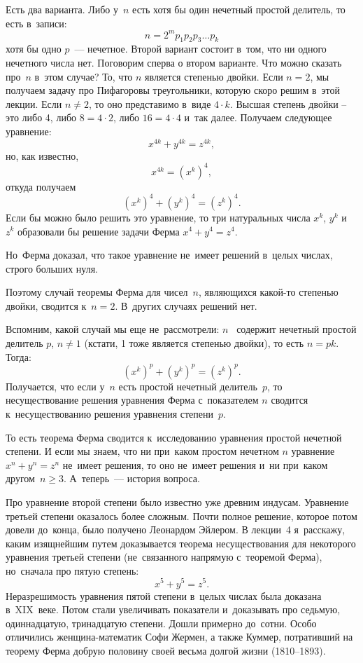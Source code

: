 Есть два варианта. Либо у~$n$ есть хотя бы один нечетный простой делитель, то есть в~записи:
$$
n=2^{m}p_{1}p_{2}p_{3}\ldots p_{k}
$$
хотя бы одно $p$~--- нечетное. Второй вариант состоит в~том, что ни одного нечетного числа нет. Поговорим сперва о втором варианте.
Что можно сказать про~$n$ в~этом случае?
 То, что $n$ является степенью двойки. Если $n=2$, мы получаем
задачу про Пифагоровы треугольники, которую скоро решим в~этой лекции. Если $n\ne2$, то оно представимо
в~виде $4\cdot k$. Высшая степень двойки -- это либо 4, либо $8=4\cdot2$, либо $16=4\cdot4$ и~так далее. Получаем следующее
уравнение:
$$
x^{4k}+y^{4k}=z^{4k},
$$
но, как известно,
$$
x^{4k}=(x^{k})^{4},
$$
откуда получаем
$$
(x^{k})^{4}+(y^{k})^{4}=(z^{k})^{4}.
$$
Если бы можно было решить это уравнение, то три натуральных числа $x^{k}$, $y^{k}$ и~$z^{k}$ образовали бы решение
задачи Ферма $x^{4}+y^{4}=z^{4}$.

Но~Ферма доказал, что такое уравнение не~имеет решений в~целых числах, строго больших нуля.

Поэтому случай теоремы Ферма для чисел~$n$, являющихся ка\-кой-то степенью двойки, сводится к~$n=2$. В~других случаях решений
нет.

Вспомним, какой случай мы еще не~рассмотрели: $n$~ содержит нечетный простой делитель $p$, $n \neq 1$
(кстати, 1 тоже является степенью двойки), то есть $n=pk$.
 Тогда:
$$
(x^{k})^{p}+(y^{k})^{p}=(z^{k})^{p}.
$$
Получается, что если у~$n$ есть простой нечетный делитель~$p$, то несуществование решения уравнения Ферма
с~показателем $n$ сводится к~несуществованию решения уравнения степени~$p$.

То есть теорема Ферма сводится к~исследованию уравнения простой нечетной степени. И если мы знаем, что ни
при~каком простом нечетном $n$ уравнение $x^{n}+y^{n}=z^{n}$ не~имеет решения, то оно не~имеет решения и~ни при~каком
другом~$n\ge3$.
А~теперь~--- история вопроса.


Про уравнение второй степени было известно уже древним индусам. Уравнение третьей степени оказалось более
сложным. Почти полное решение, которое потом довели до~конца, было получено Леонардом Эйлером.
В лекции~4 я~расскажу, каким изящнейшим путем доказывается теорема несуществования для некоторого уравнения третьей
степени (не~связанного напрямую с~теоремой Ферма), но~сначала про пятую степень:
$$
x^{5}+y^{5}=z^{5}.
$$
Неразрешимость уравнения пятой степени в~целых числах была доказана в~XIX~веке. Потом стали
увеличивать показатели и~доказывать про седьмую, одиннадцатую, тринадцатую степени. Дошли примерно до~сотни. Особо
отличились женщина-математик Софи Жермен, а также Куммер, потративший на теорему Ферма добрую половину своей весьма долгой жизни (1810--1893).

